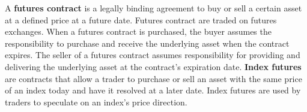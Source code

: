 \hfill \break

A \textbf{futures contract} is a legally binding agreement to buy or sell a certain asset at a defined price at a future date. 
Futures contract are traded on futures exchanges. 
When a futures contract is purchased, the buyer assumes the responsibility to purchase and receive the underlying asset when the contract expires.
The seller of a futures contract assumes responsibility for providing and delivering the underlying asset at the contract's expiration date. 
\textbf{Index futures} are contracts that allow a trader to purchase or sell an asset with the same price of an index today and have it resolved at a later date.
Index futures are used by traders to speculate on an index's price direction. 
